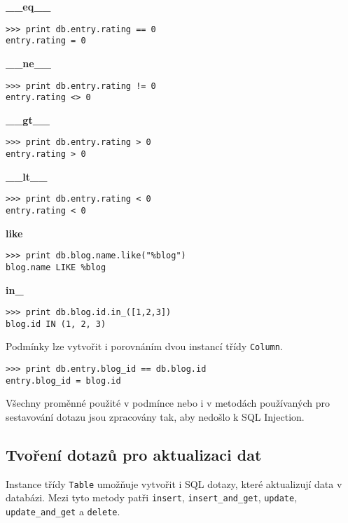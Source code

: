 \documentclass[11pt]{article}
\begin{document}
\textbf{\_\_eq\_\_}
\begin{lstlisting}[style=python]
>>> print db.entry.rating == 0
entry.rating = 0
\end{lstlisting}
\textbf{\_\_ne\_\_}
\begin{lstlisting}[style=python]
>>> print db.entry.rating != 0
entry.rating <> 0
\end{lstlisting}
\textbf{\_\_gt\_\_}
\begin{lstlisting}[style=python]
>>> print db.entry.rating > 0
entry.rating > 0
\end{lstlisting}
\textbf{\_\_lt\_\_}
\begin{lstlisting}[style=python]
>>> print db.entry.rating < 0
entry.rating < 0
\end{lstlisting}
\textbf{like}
\begin{lstlisting}[style=python]
>>> print db.blog.name.like("%blog")
blog.name LIKE %blog
\end{lstlisting}
\textbf{in\_}
\begin{lstlisting}[style=python]
>>> print db.blog.id.in_([1,2,3])
blog.id IN (1, 2, 3)
\end{lstlisting}

Podmínky lze vytvořit i porovnáním dvou instancí třídy \lstinline[style=inline]|Column|.
\begin{lstlisting}[style=python]
>>> print db.entry.blog_id == db.blog.id
entry.blog_id = blog.id
\end{lstlisting}
Všechny proměnné použité v podmínce nebo i v metodách používaných pro sestavování dotazu jsou zpracovány tak, aby nedošlo k SQL Injection. 

\subsection{Tvoření dotazů pro aktualizaci dat}

Instance třídy \lstinline[style=inline]|Table| umožňuje vytvořit i SQL dotazy, které aktualizují data v databázi. Mezi tyto metody patři \lstinline[style=inline]|insert|, \lstinline[style=inline]|insert_and_get|, \lstinline[style=inline]|update|, \lstinline[style=inline]|update_and_get| a \lstinline[style=inline]|delete|.
\end{document}
